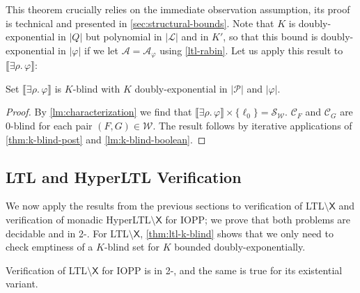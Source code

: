 \documentclass[10pt,a4paper]{article}
\newcommand{\set}[1]{\{#1\}}
\newcommand{\size}[1]{|#1|}
\newcommand{\prot}{\mathcal{P}}
\newcommand{\run}{\rho}
\newcommand*{\states}{Q}
\newcommand{\satset}[1]{\llbracket {#1} \rrbracket}
\newcommand{\cSet}{\mathcal{S}}  %
\newcommand*{\buchiaut}{\mathcal{A}}
\newcommand*{\ltlaut}[1]{\buchiaut_{#1}}
\newcommand{\bstates}{\mathcal{L}}
\newcommand*{\abuchistate}{\ell}
\newcommand*{\bstate}{\abuchistate}
\newcommand*{\binitstate}{\bstate_0}
\newcommand*{\bwinning}{\mathcal{W}}
\newcommand{\prodconfigs}{\mathcal{C}}
\newcommand{\prodconfigsproj}[1]{\prodconfigs_{#1}}
\newcommand{\ltlnext}{\mathsf{X}}
\newcommand{\ltlgre}{\cSet_\bwinning}
\begin{document}
This theorem crucially relies on the immediate observation assumption, its proof is technical and presented in \cref{sec:structural-bounds}.
Note that \(K\) is doubly-exponential in \(\size{\states}\) but polynomial in \(\size{\bstates}\) and in \(K'\), so that this bound is doubly-exponential in \(\size{\varphi}\) if we let \(\buchiaut = \ltlaut{\varphi}\) using \cref{ltl-rabin}.
%
%
Let us apply this result to \(\satset{\exists \run .
	\, \varphi}\):

\begin{lemma}
	\label{thm:ltl-k-blind}
	Set \(\satset{\exists \run .
		\, \varphi}\) is \(K\)-blind with
	\(K\) doubly-exponential in \(\size{\prot}\)  and \(\size{\varphi}\).
\end{lemma}
\begin{proof}
	By \cref{lm:characterization} we find that \(\satset{\exists \run .
		\, \varphi} \times \set{\binitstate} = \ltlgre\).
	\(\prodconfigsproj{F}\) and \(\prodconfigsproj{G}\) are \(0\)-blind for each pair \((F, G) \in \bwinning\).
	The result follows by iterative applications of \cref{thm:k-blind-post} and \cref{lm:k-blind-boolean}.
\end{proof}

%
\subsection{LTL and HyperLTL Verification}
We now apply the results from the previous sections to verification of LTL\(\setminus \ltlnext\) and verification of monadic HyperLTL\(\setminus \ltlnext\) for IOPP; we prove that both problems are decidable and in 2-\EXPSPACE.
For LTL\(\setminus \ltlnext\), \cref{thm:ltl-k-blind} shows that we only need to check emptiness of a \(K\)-blind set for \(K\) bounded doubly-exponentially.

\begin{theorem}
	\label{thm:ltl-iopp}
	Verification of LTL\(\setminus \ltlnext\) for IOPP is in 2-\EXPSPACE, and the same is true for its existential variant.
\end{theorem}
\end{document}
